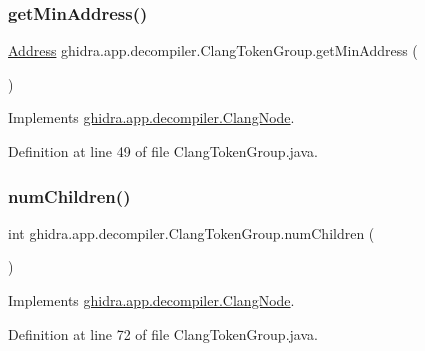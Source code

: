 \subsubsection{\texorpdfstring{getMinAddress()}{getMinAddress()}}
{\footnotesize\ttfamily \mbox{\hyperlink{class_address}{Address}} ghidra.\+app.\+decompiler.\+Clang\+Token\+Group.\+get\+Min\+Address (\begin{DoxyParamCaption}{ }\end{DoxyParamCaption})\hspace{0.3cm}{\ttfamily [inline]}}



Implements \mbox{\hyperlink{interfaceghidra_1_1app_1_1decompiler_1_1_clang_node_a28f86ac40636cd77392e26367db69dc3}{ghidra.\+app.\+decompiler.\+Clang\+Node}}.



Definition at line 49 of file Clang\+Token\+Group.\+java.

\mbox{\label{classghidra_1_1app_1_1decompiler_1_1_clang_token_group_a68d733e3de7a23187bc6e17891b01a63}} 
\subsubsection{\texorpdfstring{numChildren()}{numChildren()}}
{\footnotesize\ttfamily int ghidra.\+app.\+decompiler.\+Clang\+Token\+Group.\+num\+Children (\begin{DoxyParamCaption}{ }\end{DoxyParamCaption})\hspace{0.3cm}{\ttfamily [inline]}}



Implements \mbox{\hyperlink{interfaceghidra_1_1app_1_1decompiler_1_1_clang_node_a28f5c1cfc3842ee74333e5d5a5910976}{ghidra.\+app.\+decompiler.\+Clang\+Node}}.



Definition at line 72 of file Clang\+Token\+Group.\+java.

